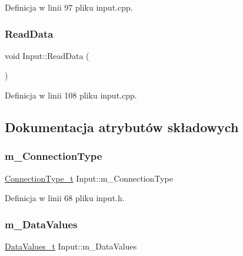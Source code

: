 Definicja w linii 97 pliku input.\+cpp.

\mbox{\label{class_input_a7da95e48dbde1c10a727545166dac288}} 
\subsubsection{\texorpdfstring{Read\+Data}{ReadData}}
{\footnotesize\ttfamily void Input\+::\+Read\+Data (\begin{DoxyParamCaption}{ }\end{DoxyParamCaption})\hspace{0.3cm}{\ttfamily [slot]}}



Definicja w linii 108 pliku input.\+cpp.



\subsection{Dokumentacja atrybutów składowych}
\mbox{\label{class_input_aeccfe44263c5985405f94c5feb0ed0aa}} 
\subsubsection{\texorpdfstring{m\+\_\+\+Connection\+Type}{m\_ConnectionType}}
{\footnotesize\ttfamily \hyperlink{class_input_a3be20be9b454515798ecd3370f4e36fd}{Connection\+Type\+\_\+t} Input\+::m\+\_\+\+Connection\+Type\hspace{0.3cm}{\ttfamily [private]}}



Definicja w linii 68 pliku input.\+h.

\mbox{\label{class_input_a8b404eeed83bc5943f5f5a71a111926a}} 
\subsubsection{\texorpdfstring{m\+\_\+\+Data\+Values}{m\_DataValues}}
{\footnotesize\ttfamily \hyperlink{struct_input_1_1_data_values__t}{Data\+Values\+\_\+t} Input\+::m\+\_\+\+Data\+Values\hspace{0.3cm}{\ttfamily [private]}}



